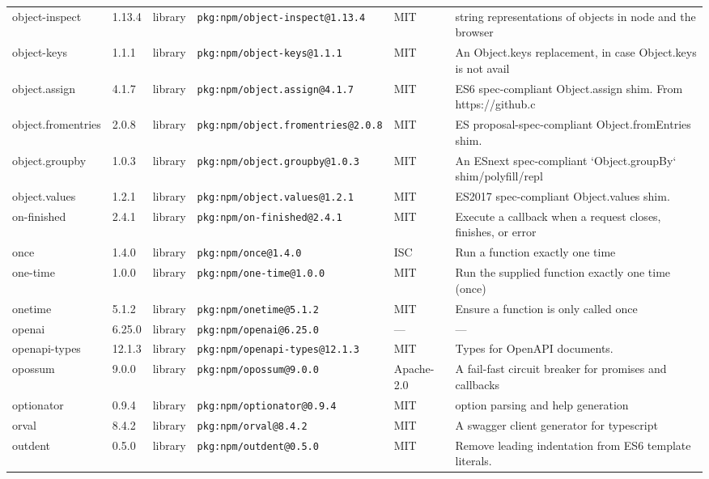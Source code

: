 \documentclass[11pt]{article}
\begin{document}
\begin{longtable}{|l|l|l|p{2.2cm}|l|p{4cm}|}
object-inspect & 1.13.4 & library & \texttt{pkg:npm/object-inspect@1.13.4} & MIT & string representations of objects in node and the browser \\
object-keys & 1.1.1 & library & \texttt{pkg:npm/object-keys@1.1.1} & MIT & An Object.keys replacement, in case Object.keys is not avail \\
object.assign & 4.1.7 & library & \texttt{pkg:npm/object.assign@4.1.7} & MIT & ES6 spec-compliant Object.assign shim. From https://github.c \\
object.fromentries & 2.0.8 & library & \texttt{pkg:npm/object.fromentries@2.0.8} & MIT & ES proposal-spec-compliant Object.fromEntries shim. \\
object.groupby & 1.0.3 & library & \texttt{pkg:npm/object.groupby@1.0.3} & MIT & An ESnext spec-compliant `Object.groupBy` shim/polyfill/repl \\
object.values & 1.2.1 & library & \texttt{pkg:npm/object.values@1.2.1} & MIT & ES2017 spec-compliant Object.values shim. \\
on-finished & 2.4.1 & library & \texttt{pkg:npm/on-finished@2.4.1} & MIT & Execute a callback when a request closes, finishes, or error \\
once & 1.4.0 & library & \texttt{pkg:npm/once@1.4.0} & ISC & Run a function exactly one time \\
one-time & 1.0.0 & library & \texttt{pkg:npm/one-time@1.0.0} & MIT & Run the supplied function exactly one time (once) \\
onetime & 5.1.2 & library & \texttt{pkg:npm/onetime@5.1.2} & MIT & Ensure a function is only called once \\
openai & 6.25.0 & library & \texttt{pkg:npm/openai@6.25.0} & — & — \\
openapi-types & 12.1.3 & library & \texttt{pkg:npm/openapi-types@12.1.3} & MIT & Types for OpenAPI documents. \\
opossum & 9.0.0 & library & \texttt{pkg:npm/opossum@9.0.0} & Apache-2.0 & A fail-fast circuit breaker for promises and callbacks \\
optionator & 0.9.4 & library & \texttt{pkg:npm/optionator@0.9.4} & MIT & option parsing and help generation \\
orval & 8.4.2 & library & \texttt{pkg:npm/orval@8.4.2} & MIT & A swagger client generator for typescript \\
outdent & 0.5.0 & library & \texttt{pkg:npm/outdent@0.5.0} & MIT & Remove leading indentation from ES6 template literals. \\

\end{longtable}
\end{document}
